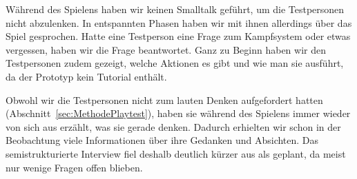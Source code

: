 \documentclass[../Main.tex]{subfiles}
\begin{document}
Während des Spielens haben wir keinen Smalltalk geführt, um die Testpersonen nicht abzulenken. In entspannten Phasen haben wir mit ihnen allerdings über das Spiel gesprochen. Hatte eine Testperson eine Frage zum Kampfsystem oder etwas vergessen, haben wir die Frage beantwortet. Ganz zu Beginn haben wir den Testpersonen zudem gezeigt, welche Aktionen es gibt und wie man sie ausführt, da der Prototyp kein Tutorial enthält.

Obwohl wir die Testpersonen nicht zum lauten Denken aufgefordert hatten (Abschnitt~\ref{sec:MethodePlaytest}), haben sie während des Spielens immer wieder von sich aus erzählt, was sie gerade denken. Dadurch erhielten wir schon in der Beobachtung viele Informationen über ihre Gedanken und Absichten. Das semistrukturierte Interview fiel deshalb deutlich kürzer aus als geplant, da meist nur wenige Fragen offen blieben.
\end{document}
